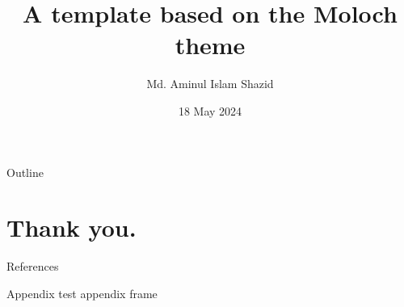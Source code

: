\documentclass[11pt, aspectratio=169]{beamer}
\title{A template based on the Moloch theme}
\author{Md. Aminul Islam Shazid}
\date{18 May 2024}
\begin{document}
	{
		\addtocounter{framenumber}{-2}    %

		\begin{frame}
			\titlepage
		\end{frame}

		\begin{frame}{Outline}
			\tableofcontents[subsectionstyle=hide]
		\end{frame}
	}

	

    \section*{Thank you.}

    \appendix

    \begingroup
    \renewcommand{\section}[2]{}%
    \begin{frame}[allowframebreaks]{References}
        \def\bibfont{\footnotesize}
            
    \end{frame}
    \endgroup

    \begin{frame}{Appendix}
        test appendix frame
    \end{frame}
\end{document}
